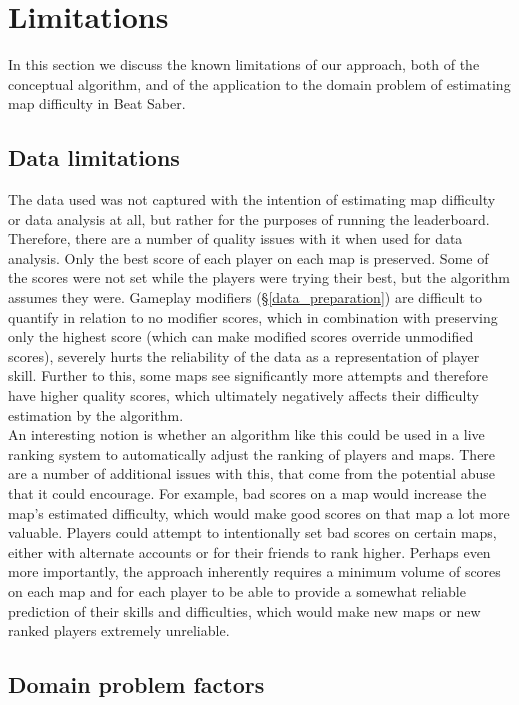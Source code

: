 \documentclass[12pt,a4paper]{article}
\begin{document}
\section{Limitations}
\label{limitations}

In this section we discuss the known limitations of our approach, both of the conceptual algorithm, and of the application to the domain problem of estimating map difficulty in Beat Saber.

\subsection{Data limitations}
\label{data_limitations}

The data used was not captured with the intention of estimating map difficulty or data analysis at all, but rather for the purposes of running the leaderboard. Therefore, there are a number of quality issues with it when used for data analysis.  Only the best score of each player on each map is preserved. Some of the scores were not set while the players were trying their best, but the algorithm assumes they were. Gameplay modifiers (\S \ref{data_preparation}) are difficult to quantify in relation to no modifier scores, which in combination with preserving only the highest score (which can make modified scores override unmodified scores), severely hurts the reliability of the data as a representation of player skill. Further to this, some maps see significantly more attempts and therefore have higher quality scores, which ultimately negatively affects their difficulty estimation by the algorithm.\\

An interesting notion is whether an algorithm like this could be used in a live ranking system to automatically adjust the ranking of players and maps. There are a number of additional issues with this, that come from the potential abuse that it could encourage. For example, bad scores on a map would increase the map's estimated difficulty, which would make good scores on that map a lot more valuable. Players could attempt to intentionally set bad scores on certain maps, either with alternate accounts or for their friends to rank higher. Perhaps even more importantly, the approach inherently requires a minimum volume of scores on each map and for each player to be able to provide a somewhat reliable prediction of their skills and difficulties, which would make new maps or new ranked players extremely unreliable.

\subsection{Domain problem factors}
\label{domain_problem_factors}
\end{document}
